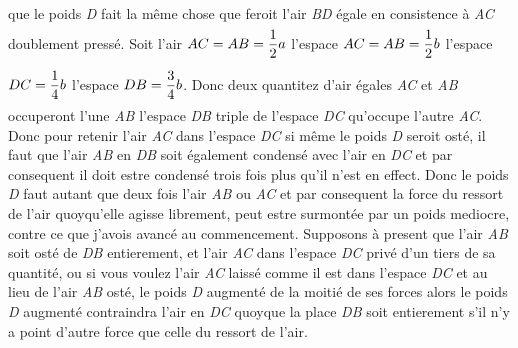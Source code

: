                         que le poids\protect{} \textit{D} fait la même chose que feroit l'air \textit{BD} \'{e}gale en consistence \`{a}  \textit{AC} doublement press\'{e}.  Soit l'air $\displaystyle AC=AB=\frac{1}{2}a\rule[-4mm]{0mm}{10mm}$ l'espace $\displaystyle AC=AB=\frac{1}{2}b\rule[-4mm]{0mm}{10mm}$ l'espace $\displaystyle DC=\frac{1}{4}b\rule[-4mm]{0mm}{10mm}$  l'espace $\displaystyle DB=\frac{3}{4}b\rule[-4mm]{0mm}{10mm}$. Donc deux quantitez d'air \'{e}gales \textit{AC} et \textit{AB} occuperont l'une \textit{AB} l'espace \textit{DB} triple de l'espace \textit{DC} qu'occupe l'autre \textit{AC}. Donc pour retenir l'air \textit{AC} dans l'espace \textit{DC} si même le poids\protect{} \textit{D} seroit ost\'{e}, il faut que l'air \textit{AB} en \textit{DB} soit \'{e}galement condens\'{e} avec l'air en \textit{DC} et par consequent il doit estre condens\'{e} trois fois plus qu'il n'est en effect. Donc le poids\protect{} \textit{D} faut autant que deux fois l'air \textit{AB} ou \textit{AC} et par consequent la force du ressort de l'air quoyqu'elle agisse librement, peut estre surmont\'{e}e par un poids\protect{} mediocre, contre ce que j'avois avanc\'{e} au commencement. Supposons \`{a} present que l'air \textit{AB} soit ost\'{e} de \textit{DB} entierement, et l'air \textit{AC} dans l'espace \textit{DC} priv\'{e} d'un tiers de sa quantit\'{e}, ou si vous voulez l'air \textit{AC} laiss\'{e} comme il est dans l'espace \textit{DC} et au lieu de l'air \textit{AB} ost\'{e}, le poids\protect{} \textit{D} augment\'{e} de la moiti\'{e} de ses forces alors le poids\protect{} \textit{D} augment\'{e} contraindra  l'air en \textit{DC} quoyque la place \textit{DB} soit entierement s'il n'y a point d'autre force que celle du ressort de l'air.\pend